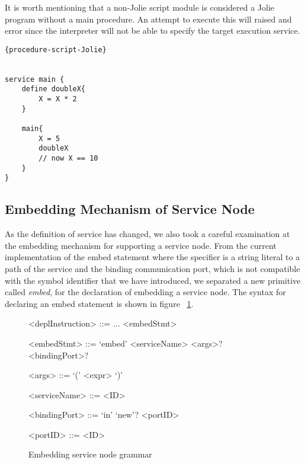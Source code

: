 It is worth mentioning that a non-Jolie script module is considered a Jolie program without a main procedure. An attempt to execute this will raised and error since the interpreter will not be able to specify the target execution service.

\begin{listing}[h]
    \lstset{language=Jolie,
        style=codeStyle
    }
    \begin{lstlisting}[frame=tlrb, caption= {A Jolie script version of ~\ref{list:procedure}}, label={list:jolie-procedure-script}]{procedure-script-Jolie}


service main {
    define doubleX{
        X = X * 2
    }

    main{
        X = 5
        doubleX
        // now X == 10
    }
}
\end{lstlisting}
\end{listing}

\subsection{Embedding Mechanism of Service Node}

As the definition of service has changed, we also took a careful examination at the embedding mechanism for supporting a service node.
From the current implementation of the embed statement where the specifier is a string literal to a path of the service and the binding communication port, which is not compatible with the symbol identifier that we have introduced, we separated a new primitive called \textit{embed}, for the declaration of embedding a service node.
The syntax for declaring an embed statement is shown in figure ~\ref{fig:jolie-servicenode-embed-grammar}.


\begin{figure}[h]
    \begin{framed}
        \begin{grammar}
            <deplInstruction> ::= ...
            \alt <embedStmt>

            <embedStmt> ::= `embed' <serviceName> <args>? <bindingPort>?

            <args> ::= `(' <expr> `)'

            <serviceName> ::= <ID>

            <bindingPort> ::= `in' `new'? <portID>

            <portID> ::= <ID>

        \end{grammar}
    \end{framed}
    \caption{Embedding service node grammar}
    \label{fig:jolie-servicenode-embed-grammar}
\end{figure}

